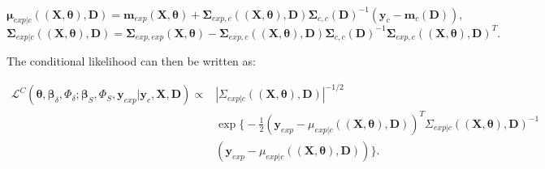 \documentclass[soumission]{jsfds}
\edef\hc{\string: }
\begin{document}
\begin{equation}
\boldsymbol{\mu}_{exp|c}((\boldsymbol{X},\boldsymbol{\theta}),\boldsymbol{D})=\boldsymbol{m}_{exp}(\boldsymbol{X},\boldsymbol{\theta})+\boldsymbol{\Sigma}_{exp,c}((\boldsymbol{X},\boldsymbol{\theta}),\boldsymbol{D})\boldsymbol{\Sigma}_{c,c}(\boldsymbol{D})^{-1}(\boldsymbol{y}_c-\boldsymbol{m}_c(\boldsymbol{D})),
\label{eq:conditionnalMean}
\end{equation}
\begin{equation}
\boldsymbol{\Sigma}_{exp|c}((\boldsymbol{X},\boldsymbol{\theta}),\boldsymbol{D})=\boldsymbol{\Sigma}_{exp,exp}(\boldsymbol{X},\boldsymbol{\theta})-\boldsymbol{\Sigma}_{exp,c}((\boldsymbol{X},\boldsymbol{\theta}),\boldsymbol{D})\boldsymbol{\Sigma}_{c,c}(\boldsymbol{D})^{-1}\boldsymbol{\Sigma}_{exp,c}((\boldsymbol{X},\boldsymbol{\theta}),\boldsymbol{D})^T.
\label{eq:conditionnalVariance}
\end{equation}

The conditional likelihood can then be written as\hc

\begin{equation}
\begin{split}
\mathcal{L}^C(\boldsymbol{\theta},\boldsymbol{\beta}_{\delta},\Phi_{\delta};\boldsymbol{\beta}_S,\Phi_S,\boldsymbol{y}_{exp}|\boldsymbol{y}_c,\boldsymbol{X},\boldsymbol{D}) \propto &|\Sigma_{exp|c}((\boldsymbol{X},\boldsymbol{\theta}),\boldsymbol{D})|^{-1/2}\\ &\exp\Big\{-\frac{1}{2}(\boldsymbol{y}_{exp}-\mu_{exp|c}((\boldsymbol{X},\boldsymbol{\theta}),\boldsymbol{D}))^T \Sigma_{exp|c}((\boldsymbol{X},\boldsymbol{\theta}),\boldsymbol{D})^{-1} \\ &(\boldsymbol{y}_{exp}-\mu_{exp|c}((\boldsymbol{X},\boldsymbol{\theta}),\boldsymbol{D}))\Big\}.
\label{eq:conditionalLikelihood}
\end{split}
\end{equation}

\end{document}
